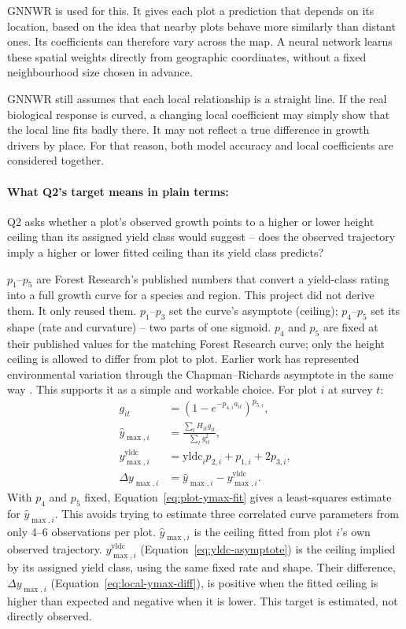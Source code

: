 GNNWR \cite{du2020Geographically_C6_GWR} is used for this. It gives each plot a prediction that depends on its location, based on the idea that nearby plots behave more similarly than distant ones. Its coefficients can therefore vary across the map. A neural network learns these spatial weights directly from geographic coordinates, without a fixed neighbourhood size chosen in advance.

GNNWR still assumes that each local relationship is a straight line. If the real biological response is curved, a changing local coefficient may simply show that the local line fits badly there. It may not reflect a true difference in growth drivers by place. For that reason, both model accuracy and local coefficients are considered together.

\paragraph*{What Q2's target means in plain terms:} Q2 asks whether a plot's observed growth points to a higher or lower height ceiling than its assigned yield class would suggest -- does the observed trajectory imply a higher or lower fitted ceiling than its yield class predicts?

$p_1$--$p_5$ are Forest Research's published numbers that convert a yield-class rating into a full growth curve for a species and region. This project did not derive them. It only reused them. $p_1$--$p_3$ set the curve's asymptote (ceiling); $p_4$--$p_5$ set its shape (rate and curvature) -- two parts of one sigmoid. $p_4$ and $p_5$ are fixed at their published values for the matching Forest Research curve; only the height ceiling is allowed to differ from plot to plot. Earlier work has represented environmental variation through the Chapman--Richards asymptote in the same way \cite{scolforo2013Dominant_C2_CR}. This supports it as a simple and workable choice. For plot $i$ at survey $t$:
\begin{align}
g_{it} &= \left(1-e^{-p_{4,i}a_{it}}\right)^{p_{5,i}}, \label{eq:git-curve} \\
\hat y_{\max,i} &= \frac{\sum_t H_{it}g_{it}}{\sum_t g_{it}^2}, \label{eq:plot-ymax-fit} \\
y_{\max,i}^{\mathrm{yldc}} &= \mathrm{yldc}_i p_{2,i}+p_{1,i}+2p_{3,i}, \label{eq:yldc-asymptote} \\
\Delta y_{\max,i} &= \hat y_{\max,i}-y_{\max,i}^{\mathrm{yldc}}. \label{eq:local-ymax-diff}
\end{align}
With $p_4$ and $p_5$ fixed, Equation~\eqref{eq:plot-ymax-fit} gives a least-squares estimate for $\hat y_{\max,i}$. This avoids trying to estimate three correlated curve parameters from only 4--6 observations per plot. $\hat y_{\max,i}$ is the ceiling fitted from plot $i$'s own observed trajectory. $y_{\max,i}^{\mathrm{yldc}}$ (Equation~\eqref{eq:yldc-asymptote}) is the ceiling implied by its assigned yield class, using the same fixed rate and shape. Their difference, $\Delta y_{\max,i}$ (Equation~\eqref{eq:local-ymax-diff}), is positive when the fitted ceiling is higher than expected and negative when it is lower. This target is estimated, not directly observed.

